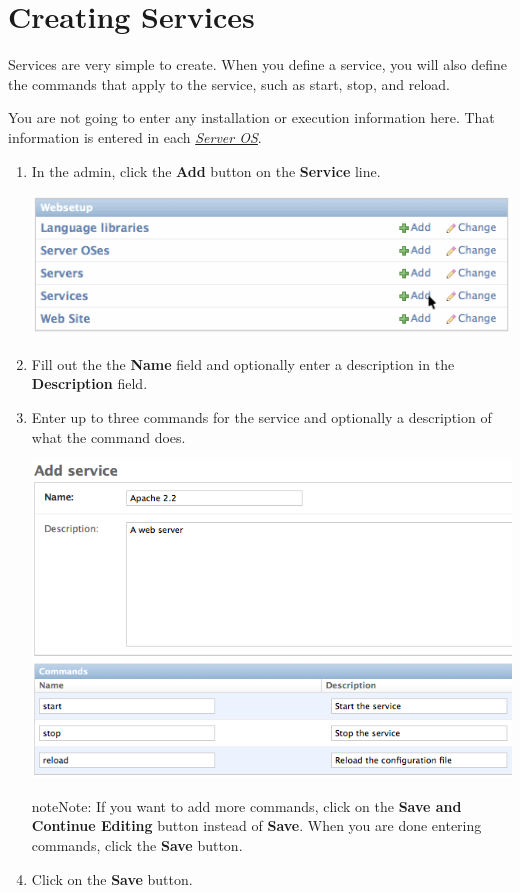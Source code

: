 \documentclass[letterpaper,10pt,english]{manual}
\begin{document}
\resetcurrentobjects
\hypertarget{--doc-gettingstarted/creating_services}{}

\hypertarget{gettingstarted-creating-services}{}\chapter{Creating Services}

Services are very simple to create. When you define a service, you will also define the commands that apply to the service, such as start, stop, and reload.

You are not going to enter any installation or execution information here. That information is entered in each \hyperlink{models-serveros}{\emph{Server OS}}.
\begin{enumerate}
\item {} 
In the admin, click the \textbf{Add} button on the \textbf{Service} line.

\includegraphics{add_service1.png}

\item {} 
Fill out the the \textbf{Name} field and optionally enter a description in the \textbf{Description} field.

\item {} 
Enter up to three commands for the service and optionally a description of what the command does.

\includegraphics{add_service_form.png}

\begin{notice}{note}{Note:}
If you want to add more commands, click on the \textbf{Save and Continue Editing} button instead of \textbf{Save}. When you are done entering commands, click the \textbf{Save} button.
\end{notice}

\item {} 
Click on the \textbf{Save} button.

\end{enumerate}
\end{document}
